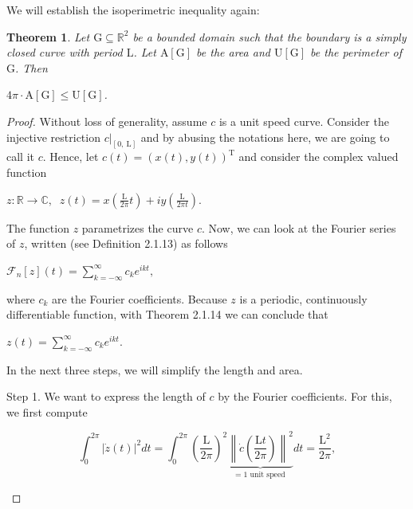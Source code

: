 \documentclass[a4paper]{book}
\newtheorem{theorem}{Theorem}%
\numberwithin{theorem}{section}%
\begin{document}
We will establish the isoperimetric inequality again:
\begin{theorem}
    Let $\mathrm{G}\subseteq\mathbb{R}^{2}$ be a bounded domain such that the boundary is a simply closed curve with period $\mathrm{L}$. Let $\mathrm{A}[\mathrm{G}]$ be the area and $\mathrm{U}[\mathrm{G}]$ be the perimeter of $\mathrm{G}$. Then
    \begin{center}
        $4\pi\cdot\mathrm{A}[\mathrm{G}]\leq\mathrm{U}[\mathrm{G}]$.
    \end{center}
\end{theorem}
\begin{proof}
    Without loss of generality, assume $c$ is a unit speed curve. Consider the injective restriction $\displaystyle \left.c\right|_{[0, \mathrm{~L}]}$ and by abusing the notations here, we are going to call it $c$. Hence, let $c(t)=(x(t), y(t))^{\mathrm{T}}$ and consider the complex valued function
    \begin{center}
        $\displaystyle z:\mathbb{R} \rightarrow \mathbb{C},\;\; z(t)=x\left(\frac{\mathrm{L}}{2 \pi} t\right)+i y\left(\frac{\mathrm{L}}{2 \pi t}\right).$
    \end{center}

    The function $z$ parametrizes the curve $c$. Now, we can look at the Fourier series of $z$, written (see Definition 2.1.13) as follows
    \begin{center}
        $\displaystyle \mathscr{F}_n[z](t)=\sum_{k=-\infty}^{\infty}c_k e^{i k t},$
    \end{center}

    where $c_k$ are the Fourier coefficients. Because $z$ is a periodic, continuously differentiable function, with Theorem 2.1.14 we can conclude that
    \begin{center}
        $\displaystyle z(t)=\sum_{k=-\infty}^{\infty} c_k e^{i k t}.$
    \end{center}

    In the next three steps, we will simplify the length and area. 
    
    Step 1. We want to express the length of $c$ by the Fourier coefficients. For this, we first compute
    \begin{center}
        \begin{equation}
            \displaystyle \int_0^{2 \pi}|\dot{z}(t)|^2 d t=\int_0^{2 \pi}\left(\frac{\mathrm{L}}{2 \pi}\right)^2 \underbrace{\left\|\dot{c}\left(\frac{\mathrm{L} t}{2 \pi}\right)\right\|^2}_{=1 \text { unit speed }} d t=\frac{\mathrm{L}^2}{2 \pi},
        \end{equation}
    \end{center}


\end{proof}
\end{document}
